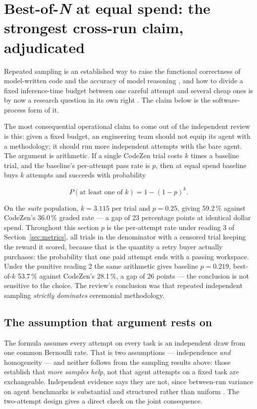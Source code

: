 \documentclass[11pt,a4paper]{article}
\begin{document}
\clearpage
\section{Best-of-\emph{N} at equal spend: the strongest cross-run claim, adjudicated}
\label{sec:bestofn}

Repeated sampling is an established way to raise the functional correctness of model-written
code \citep{chen2021codex} and the accuracy of model reasoning \citep{wang2023selfconsistency},
and how to divide a fixed inference-time budget between one careful attempt and several cheap
ones is by now a research question in its own right \citep{snell2024scaling}. The claim below
is the software-process form of it.

The most consequential operational claim to come out of the independent review is this: given
a fixed budget, an engineering team should not equip its agent with a methodology; it should
run more independent attempts with the bare agent. The argument is arithmetic. If a single
CodeZen trial costs $k$ times a baseline trial, and the baseline's per-attempt pass rate is
$p$, then at equal spend baseline buys $k$ attempts and succeeds with probability

\[ P(\text{at least one of } k) = 1 - (1-p)^k. \]

On the \emph{suite} population, $k = 3.115$ per trial and $p = 0.25$, giving 59.2\,\% against
CodeZen's 36.0\,\% graded rate --- a gap of 23 percentage points at identical dollar spend.
Throughout this section $p$ is the per-attempt rate under reading 3 of
Section~\ref{sec:metrics}, all trials in the denominator with a censored trial keeping the
reward it scored, because that is the quantity a retry buyer actually purchases: the
probability that one paid attempt ends with a passing workspace. Under the punitive reading 2
the same arithmetic gives baseline $p = 0.219$, best-of-$k$ 53.7\,\% against CodeZen's
28.1\,\%, a gap of 26 points --- the conclusion is not sensitive to the choice.
The review's conclusion was that repeated independent sampling \emph{strictly dominates}
ceremonial methodology.

\subsection{The assumption that argument rests on}

The formula assumes every attempt on every task is an independent draw from one common
Bernoulli rate. That is two assumptions --- independence \emph{and} homogeneity --- and neither
follows from the sampling results above: those establish that \emph{more samples help}, not
that agent attempts on a fixed task are exchangeable. Independent evidence says they are not,
since between-run variance on agent benchmarks is substantial and structured rather than
uniform \citep{bjarnason2026randomness}. The two-attempt design gives a direct check on the
joint consequence.
\end{document}
